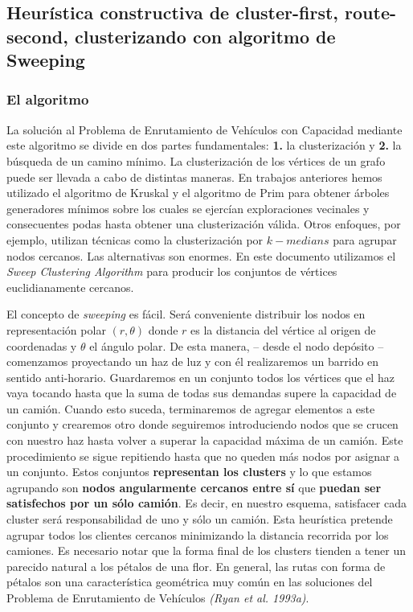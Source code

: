 \subsection{Heurística constructiva de cluster-first, route-second, clusterizando con algoritmo de Sweeping} \label{subsection:sweep}
\subsubsection{El algoritmo}
La solución al Problema de Enrutamiento de Vehículos con Capacidad mediante este algoritmo se divide en dos partes fundamentales: \textbf{1.} la clusterización y \textbf{2.} la búsqueda de un camino mínimo. La clusterización de los vértices de un grafo puede ser llevada a cabo de distintas maneras. En trabajos anteriores hemos utilizado el algoritmo de Kruskal y el algoritmo de Prim para obtener árboles generadores mínimos sobre los cuales se ejercían exploraciones vecinales y consecuentes podas hasta obtener una clusterización válida. Otros enfoques, por ejemplo, utilizan técnicas como la clusterización por $k-medians$ para agrupar nodos cercanos. Las alternativas son enormes. En este documento utilizamos el \textit{Sweep Clustering Algorithm} para producir los conjuntos de vértices euclidianamente cercanos.

\vskip 8pt

El concepto de \textit{sweeping} es fácil. Será conveniente distribuir los nodos en representación polar $(r, \theta)$ donde $r$ es la distancia del vértice al origen de coordenadas y $\theta$ el ángulo polar. De esta manera, – desde el nodo depósito – comenzamos proyectando un haz de luz y con él realizaremos un barrido en sentido anti-horario. Guardaremos en un conjunto todos los vértices que el haz vaya tocando hasta que la suma de todas sus demandas supere la capacidad de un camión. Cuando esto suceda, terminaremos de agregar elementos a este conjunto y crearemos otro donde seguiremos introduciendo nodos que se crucen con nuestro haz hasta volver a superar la capacidad máxima de un camión. Este procedimiento se sigue repitiendo hasta que no queden más nodos por asignar a un conjunto. Estos conjuntos \textbf{representan los clusters} y lo que estamos agrupando son \textbf{nodos angularmente cercanos entre sí} que \textbf{puedan ser satisfechos por un sólo camión}. Es decir, en nuestro esquema, satisfacer cada cluster será responsabilidad de uno y sólo un camión. Esta heurística pretende agrupar todos los clientes cercanos minimizando la distancia recorrida por los camiones. Es necesario notar que la forma final de los clusters tienden a tener un parecido natural a los pétalos de una flor. En general, las rutas con forma de pétalos son una característica geométrica muy común en las soluciones del Problema de Enrutamiento de Vehículos \textit{(Ryan et al. 1993a)}.


